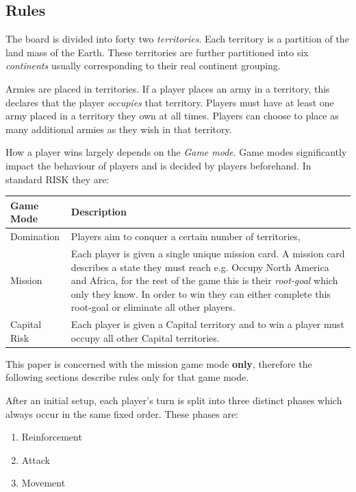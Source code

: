 \documentclass[parskip]{cs4rep}
\begin{document}
\subsection{Rules}

The board is divided into forty two \textit{territories}. Each territory is a partition of the land mass of the Earth. These territories are further partitioned into six \textit{continents} usually corresponding to their real continent grouping.

Armies are placed in territories. If a player places an army in a territory, this declares that the player \textit{occupies} that territory. Players must have at least one army placed in a territory they own at all times. Players can choose to place as many additional armies as they wish in that territory.

How a player wins largely depends on the \textit{Game mode}. Game modes significantly impact the behaviour of players and is decided by players beforehand. In standard RISK they are:
\newline

\begin{tabular}{|l|p{11cm}|}
\hline 
\textbf{Game Mode} & \textbf{Description} \\ 
\hline 
Domination & Players aim to conquer a certain number of territories, \\ 
\hline 
Mission & Each player is given a single unique mission card. A mission card describes a state they must reach e.g. Occupy North America and Africa, for the rest of the game this is their \textit{root-goal} which only they know. In order to win they can either complete this root-goal or eliminate all other players. \\ 
\hline 
Capital Risk & Each player is given a Capital territory and to win a player must occupy all other Capital territories. \\ 
\hline
\end{tabular} 

This paper is concerned with the mission game mode \textbf{only}, therefore the following sections describe rules only for that game mode.

After an initial setup, each player's turn is split into three distinct phases which always occur in the same fixed order. These phases are:

\begin{enumerate}
\item
Reinforcement
\item
Attack
\item
Movement
\end{enumerate}
\end{document}
